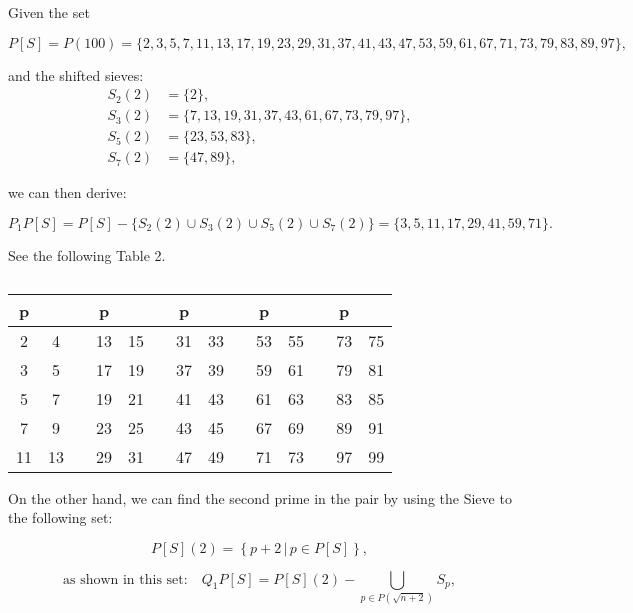 \documentclass{article}
\begin{document}
Given the set 

\begin{equation}
P[S] = P(100) = \{ 2,3,5,7,11,13,17,19,23,29,31,37,41,43,47,53,59,61,67,71,73,79,83,89,97\} ,
\end{equation}

and the shifted sieves:
\begin{align*}
S_{2}(2) & = \{ 2\}, \\
S_{3}(2) & = \{ 7,13,19,31,37,43,61,67,73,79, 97\}, \\
S_{5}(2) & = \{ 23, 53,83\}, \\
S_{7}(2) & = \{ 47,89\},
\end{align*}

we can then derive:

\begin{equation}
P_{1}P[S] = P[S] - \{ S_{2}(2) \cup S_{3}(2) \cup S_{5}(2) \cup S_{7}(2)\} = \{ 3, 5, 11, 17, 29, 41, 59, 71\}.
\end{equation}
\vspace{1\baselineskip}

See the following Table 2.
\begin{table}[H]
\centering
\begin{adjustbox}{max width=\textwidth}
\begin{tabular}{|c|c|c|c|c|c|c|c|c|c|c|c|c|c|}
\hline
p &  &  & p &  &  & p &  &  & p &  &  & p &  \\
\hline
2 & 4 &  & 13 & 15 &  & 31 & 33 &  & 53 & 55 &  & 73 & 75 \\
3 & 5 &  & 17 & 19 &  & 37 & 39 &  & 59 & 61 &  & 79 & 81 \\
5 & 7 &  & 19 & 21 &  & 41 & 43 &  & 61 & 63 &  & 83 & 85 \\
7 & 9 &  & 23 & 25 &  & 43 & 45 &  & 67 & 69 &  & 89 & 91 \\
11 & 13 &  & 29 & 31 &  & 47 & 49 &  & 71 & 73 &  & 97 & 99 \\
\hline
\end{tabular}
\end{adjustbox}
\caption{}
\end{table}

On the other hand, we can find the second prime in the pair by using the Sieve to the following set: 

\begin{equation}
P[S](2) = \left\{ p+2 \, | \, p \in P[S] \right\},
\end{equation}

\begin{equation}
\text{as shown in this set:} \quad Q_{1}P[S] = P[S](2) - \bigcup_{p \in P(\sqrt{n+2})} S_{p},
\end{equation}
\end{document}
